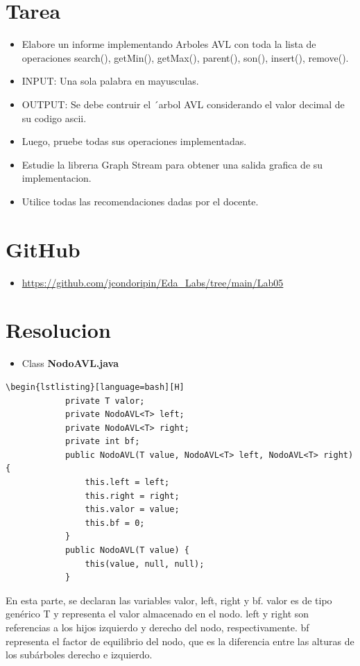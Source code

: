 \documentclass{article}
\begin{document}
    \section{Tarea}
    \begin{itemize}
        \item Elabore un informe implementando Arboles AVL con toda la lista de operaciones  search(), getMin(), getMax(), parent(), son(), insert(), remove().
        \item INPUT: Una sola palabra en mayusculas.
        \item OUTPUT: Se debe contruir el ´arbol AVL considerando el valor decimal de su codigo ascii.
        \item Luego, pruebe todas sus operaciones implementadas.
        \item Estudie la librerıa Graph Stream para obtener una salida grafica de su implementacion.
        \item Utilice todas las recomendaciones dadas por el docente.
    \end{itemize}
    \section{GitHub}
    \begin{itemize}	
        \item \url{https://github.com/jcondoripin/Eda_Labs/tree/main/Lab05}	

\end{itemize}
\clearpage
\section{Resolucion}

    \begin{itemize}
        \item Class \textbf{NodoAVL.java}
    \end{itemize}
    \begin{lstlisting}[caption={\textbf{Parte 1: Declaración de variables y constructores}}]
        \begin{lstlisting}[language=bash][H] 
            private T valor;
            private NodoAVL<T> left;
            private NodoAVL<T> right;
            private int bf;
            public NodoAVL(T value, NodoAVL<T> left, NodoAVL<T> right) {
                this.left = left;
                this.right = right;
                this.valor = value;
                this.bf = 0;
            }
            public NodoAVL(T value) {
                this(value, null, null);
            }
         \end{lstlisting}
En esta parte, se declaran las variables valor, left, right y bf. valor es de tipo genérico T y representa el valor almacenado en el nodo. left y right son referencias a los hijos izquierdo y derecho del nodo, respectivamente. bf representa el factor de equilibrio del nodo, que es la diferencia entre las alturas de los subárboles derecho e izquierdo.
\end{document}
